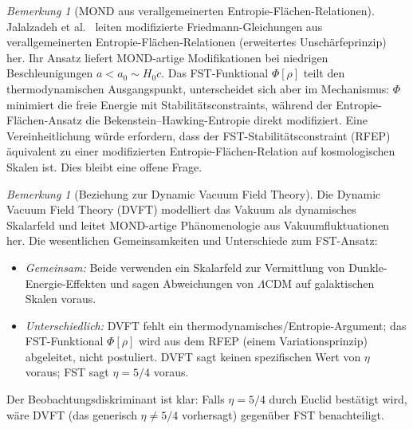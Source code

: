 \documentclass[12pt,a4paper]{article}
\theoremstyle{definition}
\theoremstyle{plain}
\theoremstyle{remark}
\newtheorem{remark}[definition]{Bemerkung}
\begin{document}
\begin{remark}[MOND aus verallgemeinerten Entropie-Fl\"achen-Relationen]
\label{rem:mond-entropy}
Jalalzadeh et al.~\cite{MONDEntropy2025} leiten modifizierte Friedmann-Gleichungen aus verallgemeinerten Entropie-Fl\"achen-Relationen (erweitertes Unsch\"arfeprinzip) her. Ihr Ansatz liefert MOND-artige Modifikationen bei niedrigen Beschleunigungen $a < a_0 \sim H_0 c$. Das FST-Funktional $\Phi[\rho]$ teilt den thermodynamischen Ausgangspunkt, unterscheidet sich aber im Mechanismus: $\Phi$ minimiert die freie Energie mit Stabilit\"atsconstraints, w\"ahrend der Entropie-Fl\"achen-Ansatz die Bekenstein--Hawking-Entropie direkt modifiziert. Eine Vereinheitlichung w\"urde erfordern, dass der FST-Stabilit\"atsconstraint (RFEP) \"aquivalent zu einer modifizierten Entropie-Fl\"achen-Relation auf kosmologischen Skalen ist. Dies bleibt eine offene Frage.
\end{remark}

\begin{remark}[Beziehung zur Dynamic Vacuum Field Theory]
\label{rem:dvft}
Die Dynamic Vacuum Field Theory (DVFT) modelliert das Vakuum als dynamisches Skalarfeld und leitet MOND-artige Ph\"anomenologie aus Vakuumfluktuationen her. Die wesentlichen Gemeinsamkeiten und Unterschiede zum FST-Ansatz:
\begin{itemize}
\item \emph{Gemeinsam:} Beide verwenden ein Skalarfeld zur Vermittlung von Dunkle-Energie-Effekten und sagen Abweichungen von $\Lambda$CDM auf galaktischen Skalen voraus.
\item \emph{Unterschiedlich:} DVFT fehlt ein thermodynamisches/Entropie-Argument; das FST-Funktional $\Phi[\rho]$ wird aus dem RFEP (einem Variationsprinzip) abgeleitet, nicht postuliert. DVFT sagt keinen spezifischen Wert von $\eta$ voraus; FST sagt $\eta = 5/4$ voraus.
\end{itemize}
Der Beobachtungsdiskriminant ist klar: Falls $\eta = 5/4$ durch Euclid best\"atigt wird, w\"are DVFT (das generisch $\eta \neq 5/4$ vorhersagt) gegen\"uber FST benachteiligt.
\end{remark}
\end{document}
